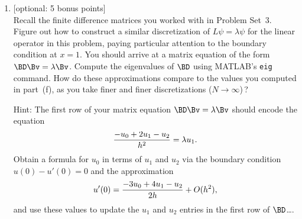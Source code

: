 \begin{enumerate}
\item {[optional: 5 bonus points]}\\
      Recall the finite difference matrices you worked with in Problem Set~3.
      Figure out how to construct a similar discretization of 
      $L \psi = \lambda \psi$ for the linear operator in this problem,
      paying particular attention to the boundary condition at $x=1$.
      You should arrive at a matrix equation
      of the form $\BD \Bv = \lambda \Bv$.  
      Compute the eigenvalues of $\BD$
      using MATLAB's \verb|eig| command.  How do these approximations
      compare to the values you computed in part~(f), as you take finer
      and finer discretizations ($N\to\infty$)\,?
      
      Hint:  The first row of your matrix equation $\BD\Bv = \lambda \Bv$ should
      encode the equation
      \[ {-u_0 + 2 u_1 - u_2 \over h^2} = \lambda u_1.\]
      Obtain a formula for $u_0$ in terms of $u_1$ and $u_2$ via 
      the boundary condition $u(0)-u'(0) = 0$ and the approximation
      \[ u'(0) = {-3u_0 + 4u_1 - u_2 \over 2h} + O(h^2),\]
      and use these values to update the $u_1$ and $u_2$ entries in the 
      first row of $\BD$\ldots.
     
\vspace*{1em}
\end{enumerate}

